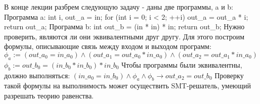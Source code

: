 \documentclass[a4paper,12pt]{article}
\begin{document}
В конце лекции разбрем следующую задачу - даны две программы, a и b:\newline
Программа a:\newline
int i, out\_a = in;\newline
for (int i = 0; i < 2; ++i) out\_a = out\_a * i;\newline
return out\_a;\newline
Программа b:\newline
int out\_b = (in * in) * in;\newline
return out\_b;\newline
Нужно проверить, являются ли они эквивалентными друг другу. Для этого построим формулы, описывающие связь между входом и выходом
программ:\newline
$\phi_a := (out\_a_0 = in\_a_0) \wedge (out\_a_1 = out\_a_0 * in\_a_0) \wedge (out\_a_2 = out\_a_1 * in\_a_0)$\newline
$\phi_b := out\_b_0 = (in\_b_0 * in\_b_0) * in\_b_0$\newline
Чтобы программы были эквивалентны, должно выполняться:\newline
$(in\_a_0 = in\_b_0) \wedge \phi_a \wedge \phi_b \rightarrow out\_a_2 = out\_b_0$\newline
Проверку такой формулы на выполнимость может осуществить SMT-решатель, умеющий разрешать теорию равенства.\newline
\end{document}
